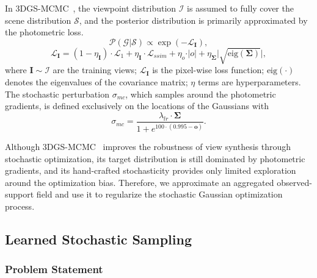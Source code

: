 \documentclass[lettersize,journal]{IEEEtran}
\begin{document}
In 3DGS-MCMC~\cite{mcmc}, the viewpoint distribution $\mathcal{I}$ is assumed to fully cover the scene distribution $\mathcal{S}$, and the posterior distribution is primarily approximated by the photometric loss. 
\begin{equation}
    \mathcal{P}(\mathcal{G} \vert \mathcal{S}) \propto \exp \left( - \mathcal{L}_{\mathbf{I}} \right), 
    \label{eq2}
\end{equation}
\begin{equation}
    \mathcal{L}_{\mathbf{I}} = \left( 1 - \eta_{\mathbf{I}} \right) \cdot \mathcal{L}_{1} + \eta_{\mathbf{I}} \cdot \mathcal{L}_{ssim} + \eta_{o} \cdot \vert o \vert + \eta_{\mathbf{\Sigma}} \vert \sqrt{\text{eig}(\mathbf{\Sigma})} \vert, 
    \label{eq3}
\end{equation}
where $\mathbf{I} \sim \mathcal{I}$ are the training views; $\mathcal{L}_{\mathbf{I}}$ is the pixel-wise loss function; $\text{eig}(\cdot)$ denotes the eigenvalues of the covariance matrix; $\eta$ terms are hyperparameters.
The stochastic perturbation $\sigma_{mc}$, which samples around the photometric gradients, is defined exclusively on the locations of the Gaussians with 
\begin{equation}
    \sigma_{mc} = \frac{\lambda_{lr} \cdot \mathbf{\Sigma}}{1 + e^{100 \cdot \left( 0.995 - \mathbf{o} \right)}}.
    \label{eq4}
\end{equation}

Although 3DGS-MCMC~\cite{mcmc} improves the robustness of view synthesis through stochastic optimization, its target distribution is still dominated by photometric gradients, and its hand-crafted stochasticity provides only limited exploration around the optimization bias. 
Therefore, we approximate an aggregated observed-support field and use it to regularize the stochastic Gaussian optimization process. 

\subsection{Learned Stochastic Sampling}

\subsubsection{Problem Statement}
\end{document}
